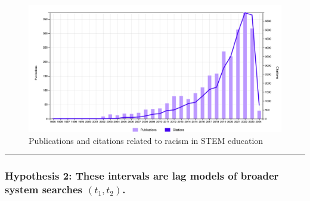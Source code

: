 \documentclass[
  letterpaper,
  DIV=11,
  numbers=noendperiod]{scrartcl}
\begin{document}
\begin{figure}

{\centering \includegraphics{report.png}

}

\caption{Publications and citations related to racism in STEM education}

\end{figure}

\begin{center}\rule{0.5\linewidth}{0.5pt}\end{center}

\hypertarget{hypothesis-2-these-intervals-are-lag-models-of-broader-system-searches-t_1-t_2.}{%
\subsubsection{\texorpdfstring{Hypothesis 2: These intervals are lag
models of broader system searches
\((t_1, t_2)\).}{Hypothesis 2: These intervals are lag models of broader system searches (t\_1, t\_2).}}\label{hypothesis-2-these-intervals-are-lag-models-of-broader-system-searches-t_1-t_2.}}
\end{document}
